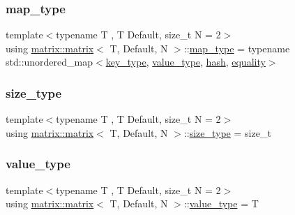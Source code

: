 \mbox{\label{structmatrix_1_1matrix_a435a771dfb8b36e4cbc5ec09cf391796}} 
\subsubsection{\texorpdfstring{map\+\_\+type}{map\_type}}
{\footnotesize\ttfamily template$<$typename T , T Default, size\+\_\+t N = 2$>$ \\
using \hyperlink{structmatrix_1_1matrix}{matrix\+::matrix}$<$ T, Default, N $>$\+::\hyperlink{structmatrix_1_1matrix_a435a771dfb8b36e4cbc5ec09cf391796}{map\+\_\+type} =  typename std\+::unordered\+\_\+map$<$\hyperlink{structmatrix_1_1matrix_af7b5498ac1b615cb9ef51bd185a2557e}{key\+\_\+type}, \hyperlink{structmatrix_1_1matrix_ab940e7a84942339cdee7c0f0d3bd8ef9}{value\+\_\+type}, \hyperlink{structmatrix_1_1matrix_1_1hash}{hash}, \hyperlink{structmatrix_1_1matrix_1_1equality}{equality}$>$}

\mbox{\label{structmatrix_1_1matrix_aebc6efd587a1c3f0a951631d6ee6837f}} 
\subsubsection{\texorpdfstring{size\+\_\+type}{size\_type}}
{\footnotesize\ttfamily template$<$typename T , T Default, size\+\_\+t N = 2$>$ \\
using \hyperlink{structmatrix_1_1matrix}{matrix\+::matrix}$<$ T, Default, N $>$\+::\hyperlink{structmatrix_1_1matrix_aebc6efd587a1c3f0a951631d6ee6837f}{size\+\_\+type} =  size\+\_\+t}

\mbox{\label{structmatrix_1_1matrix_ab940e7a84942339cdee7c0f0d3bd8ef9}} 
\subsubsection{\texorpdfstring{value\+\_\+type}{value\_type}}
{\footnotesize\ttfamily template$<$typename T , T Default, size\+\_\+t N = 2$>$ \\
using \hyperlink{structmatrix_1_1matrix}{matrix\+::matrix}$<$ T, Default, N $>$\+::\hyperlink{structmatrix_1_1matrix_ab940e7a84942339cdee7c0f0d3bd8ef9}{value\+\_\+type} =  T}




